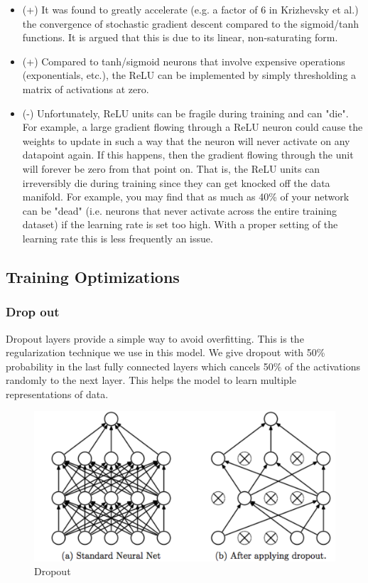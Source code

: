 \documentclass[12pt]{report}
\begin{document}
\begin{itemize}

\item (+) It was found to greatly accelerate (e.g. a factor of 6 in Krizhevsky et al.) the convergence of stochastic gradient descent compared to the sigmoid/tanh functions. It is argued that this is due to its linear, non-saturating form.
\item (+) Compared to tanh/sigmoid neurons that involve expensive operations (exponentials, etc.), the ReLU can be implemented by simply thresholding a matrix of activations at zero.
\item (-) Unfortunately, ReLU units can be fragile during training and can "die". For example, a large gradient flowing through a ReLU neuron could cause the weights to update in such a way that the neuron will never activate on any datapoint again. If this happens, then the gradient flowing through the unit will forever be zero from that point on. That is, the ReLU units can irreversibly die during training since they can get knocked off the data manifold. For example, you may find that as much as 40\% of your network can be "dead" (i.e. neurons that never activate across the entire training dataset) if the learning rate is set too high. With a proper setting of the learning rate this is less frequently an issue.

\end{itemize}

\subsection*{Training Optimizations}
\subsubsection*{Drop out}
Dropout layers provide a simple way to avoid overfitting. This is the regularization technique we use in this model. We give dropout with 50\% probability in the last fully connected layers which cancels 50\% of the activations randomly to the next layer. This helps the model to learn multiple representations of data.

\begin{figure}[h]
    \centering
    \includegraphics[scale=.25]{dropout.png}
    \caption{Dropout}
\end{figure}
\end{document}
